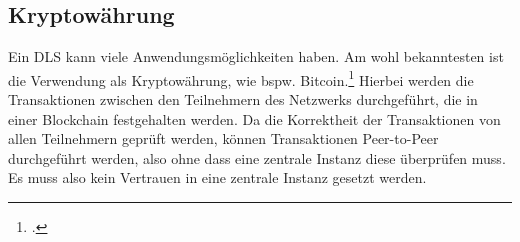\subsection{Kryptowährung}
\label{sec:definition-kryptowaehrung}
Ein DLS kann viele Anwendungsmöglichkeiten haben. Am wohl bekanntesten ist die Verwendung als Kryptowährung, wie bspw. Bitcoin.\footcite[Vgl. hierzu und zum Folgenden][1]{q4} 
Hierbei werden die Transaktionen zwischen den Teilnehmern des Netzwerks durchgeführt, die in einer Blockchain festgehalten werden. 
Da die Korrektheit der Transaktionen von allen Teilnehmern geprüft werden, können Transaktionen Peer-to-Peer durchgeführt werden, also ohne dass eine zentrale Instanz diese überprüfen muss.
Es muss also kein Vertrauen in eine zentrale Instanz gesetzt werden.